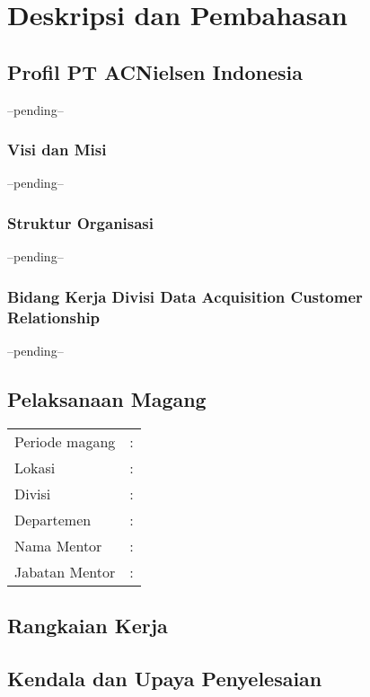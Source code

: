 \chapter{Deskripsi dan Pembahasan}

\section{Profil PT ACNielsen Indonesia}
--pending--
\subsection{Visi dan Misi}
--pending--
\subsection{Struktur Organisasi}
--pending--
\subsection{Bidang Kerja Divisi Data Acquisition Customer Relationship}
--pending--
\section{Pelaksanaan Magang}

\begin{tabular}{ll}
Periode magang & : \\
Lokasi & : \\
Divisi & : \\
Departemen & : \\
Nama Mentor & : \\
Jabatan Mentor & : \\
\end{tabular}

\section{Rangkaian Kerja}
\section{Kendala dan Upaya Penyelesaian}